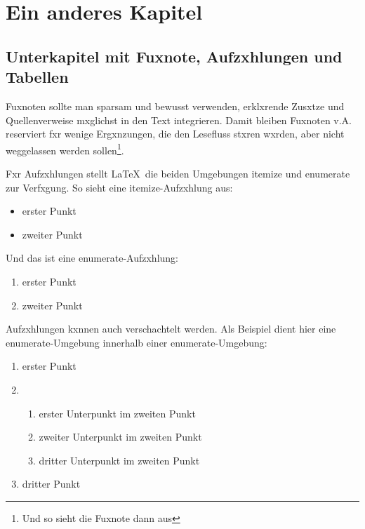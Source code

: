     \chapter{Ein anderes Kapitel}
                
        \section{Unterkapitel mit Fuxnote, Aufzxhlungen und Tabellen}\label{sec_fussnot}
                
            Fuxnoten sollte man sparsam und bewusst verwenden, erklxrende Zusxtze und Quellenverweise mxglichst in den Text integrieren. Damit bleiben Fuxnoten v.A. reserviert fxr wenige Ergxnzungen, die den Lesefluss stxren wxrden, aber nicht weggelassen werden sollen\footnote{Und so sieht die Fuxnote dann aus}.

            Fxr Aufzxhlungen stellt \LaTeX\ die beiden Umgebungen itemize und enumerate zur Verfxgung. So sieht eine itemize-Aufzxhlung aus:

            \begin{itemize}\setlength{\itemsep}{0ex} %
                \item erster Punkt
                \item zweiter Punkt
            \end{itemize}

            Und das ist eine enumerate-Aufzxhlung:

            \begin{enumerate}\setlength{\itemsep}{0ex}
                \item erster Punkt
                \item zweiter Punkt
            \end{enumerate}

            Aufzxhlungen kxnnen auch verschachtelt werden. Als Beispiel dient hier eine enumerate-Umgebung innerhalb einer enumerate-Umgebung:

            \begin{enumerate}\setlength{\itemsep}{0ex}
                \item erster Punkt
                \item 
                    \begin{enumerate}\setlength{\itemsep}{-0.5ex}
                    \item erster Unterpunkt im zweiten Punkt
                    \item zweiter Unterpunkt im zweiten Punkt
                    \item dritter Unterpunkt im zweiten Punkt
                    \end{enumerate}
                \item dritter Punkt
            \end{enumerate}

